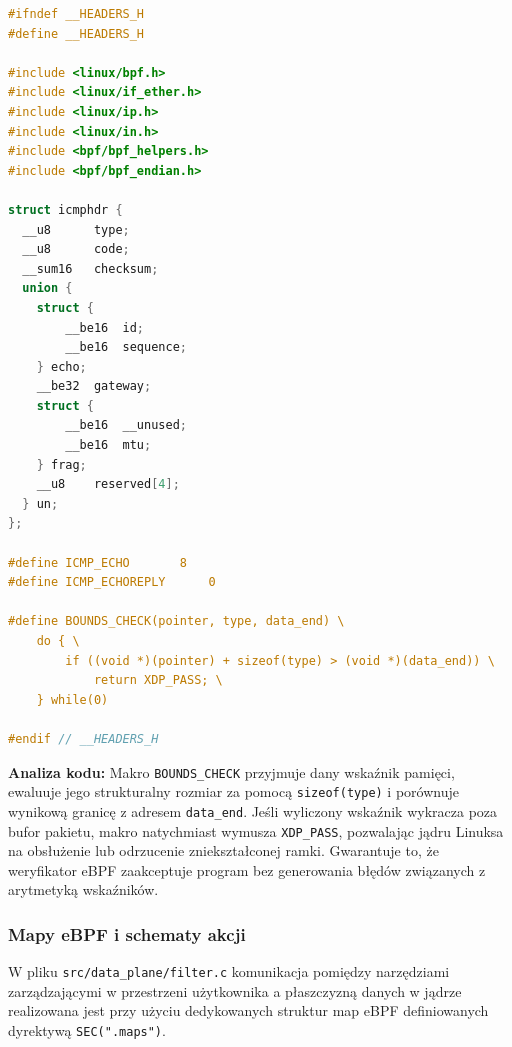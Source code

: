 \documentclass[11pt,a4paper]{article}
\begin{document}
\begin{lstlisting}[language=C, title={src/data\_plane/headers.h - Glowne makra i struktury}]
#ifndef __HEADERS_H
#define __HEADERS_H

#include <linux/bpf.h>
#include <linux/if_ether.h>
#include <linux/ip.h>
#include <linux/in.h>
#include <bpf/bpf_helpers.h>
#include <bpf/bpf_endian.h>

struct icmphdr {
  __u8		type;
  __u8		code;
  __sum16	checksum;
  union {
	struct {
		__be16	id;
		__be16	sequence;
	} echo;
	__be32	gateway;
	struct {
		__be16	__unused;
		__be16	mtu;
	} frag;
	__u8	reserved[4];
  } un;
};

#define ICMP_ECHO		8
#define ICMP_ECHOREPLY		0

#define BOUNDS_CHECK(pointer, type, data_end) \
    do { \
        if ((void *)(pointer) + sizeof(type) > (void *)(data_end)) \
            return XDP_PASS; \
    } while(0)

#endif // __HEADERS_H
\end{lstlisting}

\noindent \textbf{Analiza kodu:} Makro \texttt{BOUNDS\_CHECK} przyjmuje dany wskaźnik pamięci, ewaluuje jego strukturalny rozmiar za pomocą \texttt{sizeof(type)} i porównuje wynikową granicę z adresem \texttt{data\_end}. Jeśli wyliczony wskaźnik wykracza poza bufor pakietu, makro natychmiast wymusza \texttt{XDP\_PASS}, pozwalając jądru Linuksa na obsłużenie lub odrzucenie zniekształconej ramki. Gwarantuje to, że weryfikator eBPF zaakceptuje program bez generowania błędów związanych z arytmetyką wskaźników.

\subsubsection{Mapy eBPF i schematy akcji}

W pliku \texttt{src/data\_plane/filter.c} komunikacja pomiędzy narzędziami zarządzającymi w przestrzeni użytkownika a płaszczyzną danych w jądrze realizowana jest przy użyciu dedykowanych struktur map eBPF definiowanych dyrektywą \texttt{SEC(".maps")}.
\end{document}
